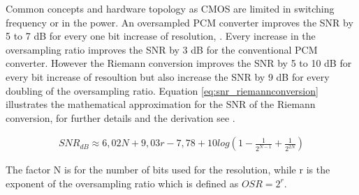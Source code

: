 \documentclass[journal]{IEEEtran}
\begin{document}
Common concepts and hardware topology as CMOS are limited in switching frequency or in the power.
An oversampled PCM converter improves the SNR by 5 to 7 dB for every one bit increase of resolution, .
Every increase in the oversampling ratio improves the SNR by 3 dB for the conventional PCM converter.
However the Riemann conversion improves the SNR by 5 to 10 dB for every bit increase of resoultion but also increase the SNR by 9 dB for every doubling of the oversampling ratio.
Equation \ref{eq:snr_riemannconversion} illustrates the mathematical approximation for the SNR of the Riemann conversion, for further details and the derivation see \cite{VeyracRivetDevalEtAl2016}.

\begin{align}
  SNR_{dB} \approx 6,02N + 9,03r - 7,78 + 10log(1- \frac{1}{2^{N-1}} + \frac{1}{2^{2N}})
    \label{eq:snr_riemannconversion}
\end{align}

The factor N is for the number of bits used for the resolution, while r is the exponent of the oversampling ratio which is defined as $OSR = 2^r$.

%
%
\end{document}
